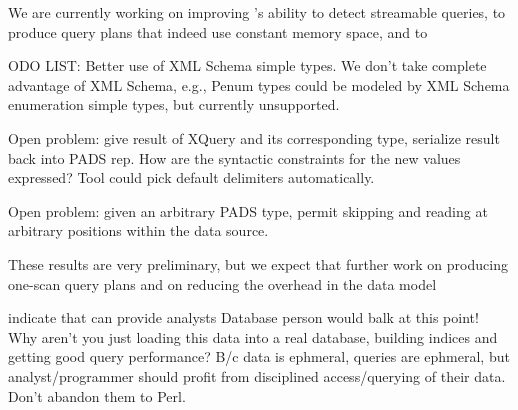 \documentclass[nocopyrightspace]{sigplanconf}
\begin{document}
We are currently working on improving \Galax{}'s ability to detect
streamable queries, to produce query plans that indeed use constant
memory space, and to 

ODO LIST: Better use of XML Schema simple types.
We don't take complete advantage of XML Schema, e.g., Penum types
could be modeled by XML Schema enumeration simple types, but currently
unsupported.

Open problem: give result of XQuery and its corresponding type,
serialize result back into PADS rep.  How are the syntactic
constraints for the new values expressed?  Tool could pick default
delimiters automatically. 

Open problem: given an arbitrary PADS type, permit skipping and
reading at arbitrary positions within the data source. 

These results are very preliminary, but we expect that further
work on producing one-scan query plans and on reducing the overhead in
the \padx{} data model 

indicate that
\padx{} can provide analysts 
Database person would balk at this point!  Why aren't you just loading
this data into a real database, building indices and getting good
query performance?  B/c data is ephmeral, queries are ephmeral, but
analyst/programmer should profit from disciplined access/querying of
their data.  Don't abandon them to Perl. 


\small
 
\end{document}
